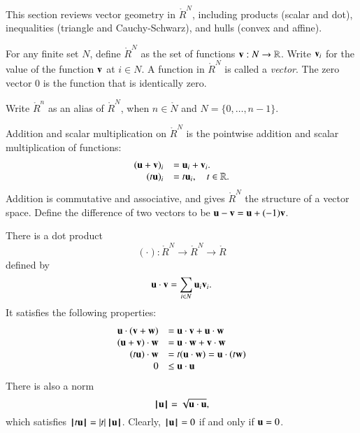 This section reviews vector geometry in $\ring{R}^N$, including products (scalar and dot), inequalities (triangle and Cauchy-Schwarz), and hulls (convex and affine).

\begin{definition}
For any finite set $N$, define $\ring{R}^N$ as the set of functions
${\mathbf v}:N\to\mathbb{R}$. Write ${\mathbf v}_i$ for the value of the function ${\mathbf v}$ at $i\in N$.
%
%
A function in $\ring{R}^N$ is called a {\it vector}.  
The zero vector $0$ is the function that is identically zero.  
%
\end{definition}
Write $\ring{R}^n$ as an alias of $\ring{R}^N$, 
when $n\in\ring{N}$ and $N=\{0,\ldots,n-1\}$.

Addition and scalar multiplication on $\ring{R}^N$
is the pointwise addition and scalar multiplication of functions:
    $$\begin{array}{rll}
    ({\mathbf u} + {\mathbf v})_i &= {\mathbf u}_i + {\mathbf v}_i.\\
    (t {\mathbf u})_i &= t {\mathbf u}_i,\quad t\in\mathbb{R}.\\
    \end{array}
    $$
%
%
Addition is commutative and associative, and gives
$\ring{R}^N$ the structure of a vector space.
Define the difference of two vectors to be ${\mathbf u} - {\mathbf v} = {\mathbf u} + (-1) {\mathbf v}$.
%

There is a dot product
$$(\cdot):\ring{R}^N\to\ring{R}^N\to\ring{R}$$ defined by
    $${\mathbf u}\cdot {\mathbf v} = \sum_{i\in N} {\mathbf u}_i {\mathbf v}_i.$$
%
%
It satisfies the following
properties:
    $$\begin{array}{rll}
        {\mathbf u} \cdot ({\mathbf v} + {\mathbf w}) &= {\mathbf u} \cdot {\mathbf v} + {\mathbf u} \cdot {\mathbf w}\\
        ({\mathbf u} + {\mathbf v})\cdot {\mathbf w} &= {\mathbf u} \cdot {\mathbf w} + {\mathbf v} \cdot {\mathbf w}\\
        (t {\mathbf u})\cdot {\mathbf w} &= t({\mathbf u} \cdot {\mathbf w}) = {\mathbf u} \cdot (t {\mathbf w})\\
        0 &\le {\mathbf u}\cdot {\mathbf u}\\
    \end{array}$$
There is also a norm
$${{\hskip0.1em|\hskip-0.15em|\hskip0.1em}{\mathbf u}{\hskip0.1em|\hskip-0.15em|\hskip0.1em}} = \sqrt{{\mathbf u}\cdot {\mathbf u}},$$
which satisfies ${{\hskip0.1em|\hskip-0.15em|\hskip0.1em} t {\mathbf u} {\hskip0.1em|\hskip-0.15em|\hskip0.1em}} = |t| \, {{\hskip0.1em|\hskip-0.15em|\hskip0.1em}{\mathbf u}{\hskip0.1em|\hskip-0.15em|\hskip0.1em}}$.  Clearly, ${{\hskip0.1em|\hskip-0.15em|\hskip0.1em}{\mathbf u}{\hskip0.1em|\hskip-0.15em|\hskip0.1em}}=0$  if and only if ${\mathbf u}=0$.
%

